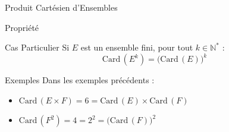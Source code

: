 \documentclass{coursbook}
\begin{document}
\begin{Gpartie}{Produit Cartésien d'Ensembles}
\begin{Spartie}{Propriété}
            \begin{SSpartie}{Cas Particulier}
                Si $E$ est un ensemble fini, pour tout $k\in\mathbb{N^*}$ :
                \[\mathrm{Card}\,\left(E^k\right)=\big(\mathrm{Card}\,(E)\big)^k\]
            \end{SSpartie}
            \begin{SSpartie}{Exemples}
                Dans les exemples précédents :
                \begin{itemize}
                    \item $\mathrm{Card}\,(E\times F)=6=\mathrm{Card}\,(E)\times\mathrm{Card}\,(F)$
                    \item $\mathrm{Card}\,\left(F^2\right)=4=2^2=\big(\mathrm{Card}\,(F)\big)^2$
                \end{itemize}
            \end{SSpartie}
        \end{Spartie}
    \end{Gpartie}
\end{document}
